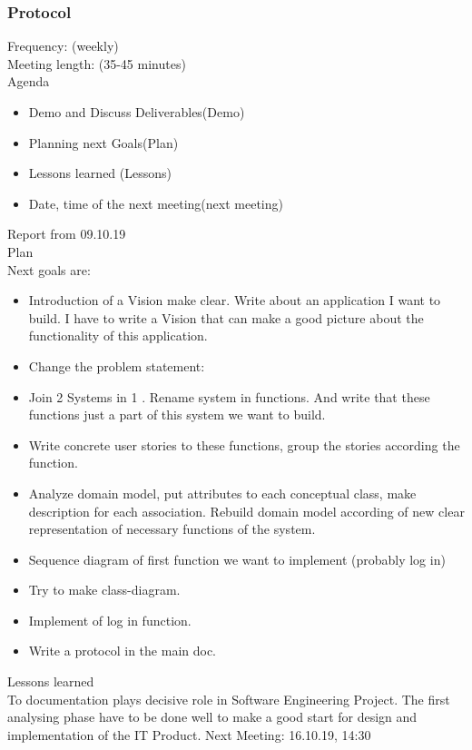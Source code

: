 \documentclass{scrartcl}
\begin{document}
   
   
   
    
   
  

\subsubsection{Protocol}
Frequency: (weekly) \\
Meeting length: (35-45 minutes)\\

Agenda

\begin{itemize}
  	\item Demo and Discuss Deliverables(Demo)
  	\item Planning next Goals(Plan)
  	\item Lessons learned (Lessons)
  	\item Date, time of the next meeting(next meeting)
 \end{itemize} 	


Report from 09.10.19\\
Plan\\
Next goals are: 
\begin{itemize}


	\item Introduction of a Vision make clear. Write about an application I want to build. I have to write a Vision that can make a good picture about the functionality of this application.
	\item	Change the problem statement: 
	\item	Join 2 Systems in 1 . Rename system in functions. And write that these functions just a part of this system we want to build. 
	\item	Write concrete user stories to these functions, group the stories according the function.
	\item	Analyze domain model, put attributes to each conceptual class, make description for each association. Rebuild domain model according of new clear representation of necessary functions of the system.
	\item	Sequence diagram of first function we want to implement (probably log in)
	\item	Try to make class-diagram.
	\item	Implement of log in function.
	\item	Write a protocol in the main doc.
\end{itemize}	
Lessons learned\\
To documentation plays decisive role in Software Engineering Project. The first analysing phase have to be done well to make a good start for design and implementation of the IT Product.
Next Meeting: 16.10.19, 14:30\\
\end{document}
